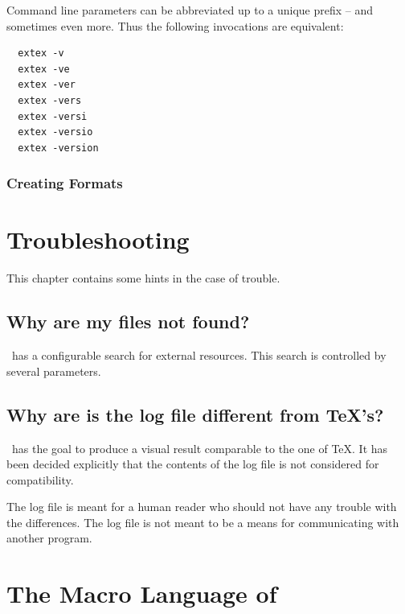 \documentclass{extex-doc}
\begin{document}
Command line parameters can be abbreviated up to a unique prefix --
and sometimes even more. Thus the following invocations are
equivalent:

\begin{verbatim}
  extex -v
  extex -ve
  extex -ver
  extex -vers
  extex -versi
  extex -versio
  extex -version  
\end{verbatim}


\subsection{Creating Formats}

\INCOMPLETE



\chapter{Troubleshooting \ExTeX}

This chapter contains some hints in the case of trouble.

\section{Why are my files not found?}

\ExTeX\ has a configurable search for external resources. This search
is controlled by several parameters.

\INCOMPLETE

\section{Why are is the log file different from \TeX's?}

\ExTeX\ has the goal to produce a visual result comparable to the one
of \TeX. It has been decided explicitly that the
contents of the log file is not considered for
compatibility.

The log file is meant for a human reader who should not have any
trouble with the differences. The log file is not meant to be a means
for communicating with another program.


\chapter{The Macro Language of \ExTeX}
\end{document}
